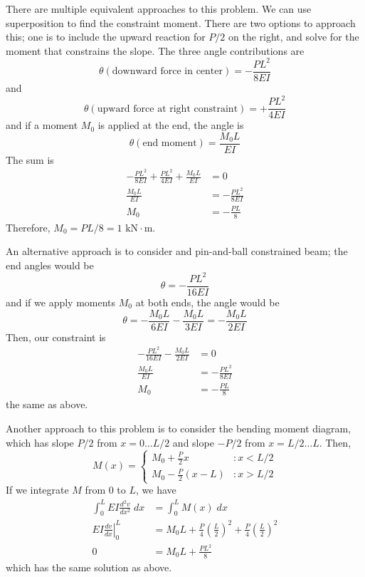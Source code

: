 \begin{solution}
There are multiple equivalent approaches to this problem. We can use superposition to find the constraint moment. There are two options to approach this; one is to include the upward reaction for $P/2$ on the right, and solve for the moment that constrains the slope. The three angle contributions are
\[
\theta(\text{downward force in center}) = -\frac{PL^2}{8EI}
\]
and
\[
\theta(\text{upward force at right constraint}) = +\frac{PL^2}{4EI}
\]
and if a moment $M_0$ is applied at the end, the angle is
\[
\theta(\text{end moment}) = \frac{M_0L}{EI}
\]
The sum is
\[
\begin{split}
-\frac{PL^2}{8EI} + \frac{PL^2}{4EI} + \frac{M_0L}{EI} &= 0\\
\frac{M_0L}{EI} &= -\frac{PL^2}{8EI}\\
M_0 &= -\frac{PL}{8}
\end{split}
\]
Therefore, $M_0 = PL/8 = 1\text{ kN}\cdot\text{m}$.

An alternative approach is to consider and pin-and-ball constrained beam; the end angles would be
\[
\theta = -\frac{PL^2}{16EI}
\]
and if we apply moments $M_0$ at both ends, the angle would be
\[
\theta = -\frac{M_0L}{6EI} - \frac{M_0L}{3EI} = -\frac{M_0L}{2EI}
\]
Then, our constraint is
\[
\begin{split}
-\frac{PL^2}{16EI} - \frac{M_0L}{2EI} &= 0\\
\frac{M_0L}{EI} &= -\frac{PL^2}{8EI}\\
M_0 &= -\frac{PL}{8}
\end{split}
\]
the same as above.

Another approach to this problem is to consider the bending moment diagram, which has slope $P/2$ from $x=0\ldots L/2$ and slope $-P/2$ from $x=L/2\ldots L$. Then,
\[
M(x)=
\begin{cases}
M_0 +\frac{P}{2}x &: x<L/2\\
M_0 -\frac{P}{2}(x-L) &: x>L/2
\end{cases}
\]
If we integrate $M$ from 0 to $L$, we have
\[
\begin{split}
\int_0^L EI\frac{d^2v}{dx^2}\; dx &= \int_0^L M(x)\;dx\\
EI\left.\frac{dv}{dx}\right|_0^L &= M_0 L +\frac{P}{4}\left(\frac{L}{2}\right)^2 +\frac{P}{4}\left(\frac{L}{2}\right)^2\\
0 &= M_0L + \frac{PL^2}{8}
\end{split}
\]
which has the same solution as above.
\end{solution}
